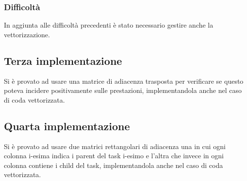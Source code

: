 \documentclass[../relazione.tex]{subfiles}
\begin{document}
\subsubsection{Difficoltà}
In aggiunta alle difficoltà precedenti è stato necessario gestire anche la vettorizzazione.

\subsection{Terza implementazione}
Si è provato ad usare una matrice di adiacenza trasposta per verificare se questo poteva incidere positivamente sulle prestazioni, implementandola anche nel caso di coda vettorizzata.

\subsection{Quarta implementazione}
Si è provato ad usare due matrici rettangolari di adiacenza una in cui ogni colonna i-esima indica i parent del task i-esimo e l'altra che invece in ogni colonna contiene i child del task, implementandola anche nel caso di coda vettorizzata.
\end{document}
